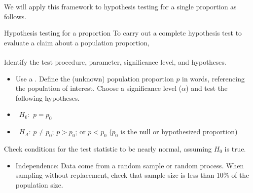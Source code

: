 \noindent We will apply this framework to hypothesis testing for a single proportion as follows.

\begin{onebox}{Hypothesis testing for a proportion}
To carry out a complete hypothesis test to evaluate a claim about a population proportion,
\\
\\
 Identify the test procedure, parameter, significance level, and hypotheses.\vspace{-1mm}
\begin{itemize}
\item[] Use a .  Define the (unknown) population proportion $p$ in words, referencing the population of interest.  Choose a significance level ($\alpha$) and test the following hypotheses.
\end{itemize}\vspace{-4mm}
\begin{itemize}
\setlength{\itemsep}{0mm}
\item[]  \quad \ $H_0$: \,$p = p_0$
\item[]  \quad \ $H_A$: $p \ne p_0$;  \; $p > p_0$; \; or \; $p < p_0$ \qquad   ($p_0$ is the null or hypothesized proportion)
\end{itemize}
  Check conditions for the test statistic to be nearly normal, assuming $H_0$ is true.\vspace{-1mm}
{\setlength{\leftmargini}{13mm}
\begin{itemize}
\setlength{\itemsep}{0mm}
\item[1.]  Independence:  Data come from a random sample or random process.  When sampling 
without replacement, check that sample size is less than 10\% of the population size.

\end{itemize}}
\end{onebox}
